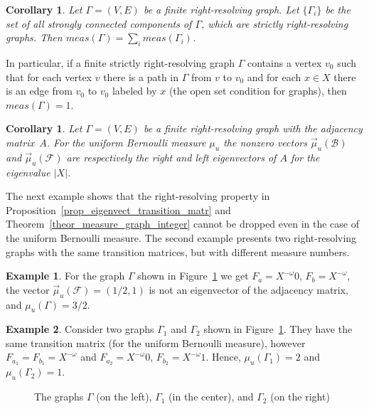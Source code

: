 \documentclass[12pt]{article}
\newcommand{\xmo}{X^{-\omega}}
\newcommand{\mgr}{meas}
\newcommand{\gr}{\Gamma}
\newcommand{\B}{\mathscr{B}}
\newcommand{\F}{\mathscr{F}}
\newtheorem{cor}[theor]{Corollary}
\theoremstyle{definition}
\newtheorem{example}{Example}
\begin{document}
\begin{cor}\label{cor_meas_sum_meas}
Let $\gr=(V,E)$ be a finite right-resolving graph. Let $\{\gr_i\}$ be the set of all strongly
connected components of $\gr$, which are strictly right-resolving graphs. Then
$\mgr(\gr)=\sum_i\mgr(\gr_i)$.
\end{cor}

In particular, if a finite strictly right-resolving graph $\gr$ contains a vertex $v_0$ such that
for each vertex $v$ there is a path in $\gr$ from $v$ to $v_0$ and for each $x\in X$ there is an
edge from $v_0$ to $v_0$ labeled by $x$ (the open set condition for graphs), then $\mgr(\gr)=1$.


\begin{cor}
Let $\gr=(V,E)$ be a finite right-resolving graph with the adjacency matrix~$A$. For the uniform
Bernoulli measure $\mu_u$ the nonzero vectors $\vec \mu_u(\B)$ and $\vec \mu_u(\F)$ are
respectively the right and left eigenvectors of $A$ for the eigenvalue $|X|$.
\end{cor}


The next example shows that the right-resolving property in
Proposition~\ref{prop_eigenvect_transition_matr} and Theorem~\ref{theor_measure_graph_integer}
cannot be dropped even in the case of the uniform Bernoulli measure. The second example presents
two right-resolving graphs with the same transition matrices, but with different measure numbers.
\begin{example}
For the graph $\gr$ shown in Figure~\ref{fig_Example_3_Graphs} we get $F_a=\xmo 0$, $F_b=\xmo$, the
vector $\vec\mu_u(\F)=(1/2,1)$ is not an eigenvector of the adjacency matrix, and $\mu_u(\gr)=3/2$.
\end{example}

\begin{example}
Consider two graphs $\gr_1$ and $\gr_2$ shown in Figure~\ref{fig_Example_3_Graphs}. They have the
same transition matrix (for the uniform Bernoulli measure), however $F_{a_1}=F_{b_1}=\xmo$ and
$F_{a_2}=\xmo 0$, $F_{b_2}=\xmo 1$. Hence, $\mu_u(\gr_1)=2$ and $\mu_u(\gr_2)=1$.
\end{example}

\begin{figure}
\begin{center}
   
  
 \caption{The graphs $\gr$ (on the
left), $\gr_1$ (in the center), and $\gr_2$ (on the right)} \label{fig_Example_3_Graphs}
\end{center}
\end{figure}
\end{document}
